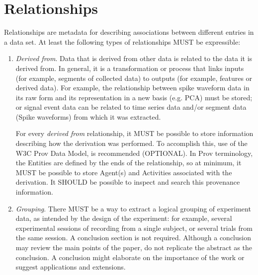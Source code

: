 \documentclass[letterpaper, 10 pt, conference]{ieeeconf}  \IEEEoverridecommandlockouts                              \overrideIEEEmargins
\begin{document}
\medskip
\section{\textbf{Relationships}}
Relationships are metadata for describing associations between different entries in a data set.  At least the following types of relationships MUST be expressible: 

\begin{enumerate}
\item \textit{Derived from}.  Data that is derived from other data is related to the data it is derived from. In general, it is a transformation or process that links inputs (for example, segments of collected data) to outputs (for example, features or derived data).  For example, the relationship between spike waveform data in its raw form and its representation in a new basis (e.g. PCA) must be stored; or signal event data can be related to time series data and/or segment data (Spike waveforms) from which it was extracted.  

For every \textit{derived from} relationship, it MUST be possible to store information describing how the derivation was performed.  To accomplish this, use of the W3C Prov Data Model, is recommended (OPTIONAL). In Prov terminology, the Entities are defined by the ends of the relationship, so at minimum, it MUST be possible to store Agent(s) and Activities associated with the derivation. It SHOULD be possible to inspect and search this provenance information.

\item \textit{Grouping}.  There MUST be a way to extract a logical grouping of experiment data, as intended by the design of the experiment: for example, several experimental sessions of recording from a single subject, or several trials from the same session.  
A conclusion section is not required. Although a conclusion may review the main points of the paper, do not replicate the abstract as the conclusion. A conclusion might elaborate on the importance of the work or suggest applications and extensions. 
\end{enumerate}

\medskip
\end{document}
